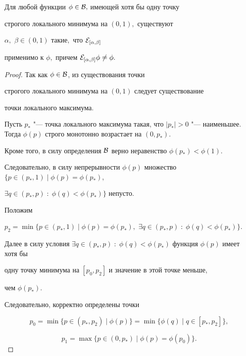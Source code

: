 \hypertarget{palin:lemma3}{}



\begin{lemma}[3]Для любой функции $\phi\in{\cal B},$ имеющей хотя бы одну точку

строгого локального минимума на $(0,1),$ существуют

$\alpha,$ $\beta\in(0,1)$ такие$,$ что ${\cal E}_{[\alpha,\beta]}$

применимо к $\phi,$ причем ${\cal E}_{[\alpha,\beta]}\phi\ne\phi.$

\end{lemma}



\smallskip



\begin{proof} Так как $\phi\in{\cal B}$, из существования точки

строгого локального минимума на $(0,1)$ следует существование

точки локального максимума. 



Пусть $p_*$ "--- точка локального максимума такая, что $|p_*|>0$ "--- наименьшее. Тогда $\phi(p)$ строго монотонно возрастает на $(0,p_*)$. 

Кроме того, в силу определения ${\cal B}$ верно неравенство $\phi(p_*)<\phi(1)$.

Следовательно, в силу непрерывности $\phi(p)$ множество $\{p\in(p_*,1)\mid \phi(p)=\phi(p_*)$, 

$\exists q\in(p_*,p)\;:\;\phi(q)<\phi(p_*)\}$ непусто. 



Положим

$p_2=\min\{p\in(p_*,1)\mid\phi(p)=\phi(p_*),$ $\exists

q\in(p_*,p) \;:\; \phi(q)<\phi(p_*)\}$. 

Далее в силу условия $\exists q\in(p_*,p) \;:\; \phi(q)<\phi(p_*)$ функция $\phi(p)$ имеет хотя бы

одну точку минимума на $[p_0,p_2]$ и значение в этой точке меньше,

чем $\phi(p_*)$. 

Следовательно, корректно определены точки

$$p_0=\min\{p\in(p_*,p_2)\mid\phi(p)\}=\min\{\phi(q)\mid q\in[p_*,p_2]\},$$

$$p_1=\max\{p\in(0,p_*)\mid \phi(p)=\phi(p_0)\}.$$ 




\end{proof}
